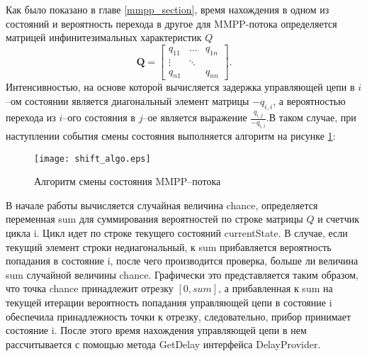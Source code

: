 Как было показано в главе \ref{mmpp_section}, время нахождения в одном из состояний и вероятность перехода в другое для MMPP-потока определяется матрицей инфинитезимальных характеристик $Q$
\begin{equation*}
	\boldsymbol{Q}=\begin{bmatrix}
		q_{11} &  \dots &  q_{1n}\\
		\vdots & \ddots &  \\
		q_{n1} &    	&	q_{nn}
	\end{bmatrix}.
\end{equation*}
Интенсивностью, на основе которой вычисляется задержка управляющей цепи в $i$--ом состоянии является диагональный элемент матрицы $-q_{i,i}$, а вероятностью перехода из $i$--ого состояния в $j$--ое является выражение $\frac{q_{i,j}}{-q_{i,i}}$.В таком случае, при наступлении события смены состояния выполняется алгоритм на рисунке \ref{shift_algo_uml}:
   \begin{figure}[H]
  	\centering
  	\texttt{[image: shift\_algo.eps]}
  	\caption{Алгоритм смены состояния MMPP--потока}
  	\label{shift_algo_uml}
  \end{figure}
В начале работы вычисляется случайная величина chance, определяется переменная sum для суммирования вероятностей по строке матрицы $Q$ и счетчик цикла i. Цикл идет по строке текущего состояний currentState. В случае, если текущий элемент строки недиагональный, к sum прибавляется вероятность попадания в состояние i, после чего производится проверка, больше ли величина sum случайной величины chance. Графически это представляется таким образом, что точка chance принадлежит отрезку $[0,sum]$, а прибавленная к sum на текущей итерации вероятность попадания управляющей цепи в состояние i обеспечила принадлежность точки к отрезку, следовательно, прибор принимает состояние i. После этого время нахождения управляющей цепи в нем рассчитывается с помощью метода GetDelay интерфейса DelayProvider.
\clearpage
